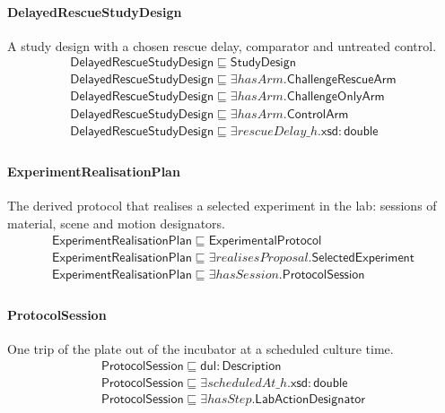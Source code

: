 \documentclass[10pt]{article}
\begin{document}
\paragraph{DelayedRescueStudyDesign} A study design with a chosen rescue delay, comparator and untreated control.
\[\begin{array}{l}
\mathsf{DelayedRescueStudyDesign} \sqsubseteq  \mathsf{StudyDesign} \\
\mathsf{DelayedRescueStudyDesign} \sqsubseteq  \exists \mathit{hasArm}.\mathsf{ChallengeRescueArm} \\
\mathsf{DelayedRescueStudyDesign} \sqsubseteq  \exists \mathit{hasArm}.\mathsf{ChallengeOnlyArm} \\
\mathsf{DelayedRescueStudyDesign} \sqsubseteq  \exists \mathit{hasArm}.\mathsf{ControlArm} \\
\mathsf{DelayedRescueStudyDesign} \sqsubseteq  \exists \mathit{rescueDelay\_h}.\mathsf{xsd{:}double} \\
\end{array}\]
\paragraph{ExperimentRealisationPlan} The derived protocol that realises a selected experiment in the lab: sessions of material, scene and motion designators.
\[\begin{array}{l}
\mathsf{ExperimentRealisationPlan} \sqsubseteq  \mathsf{ExperimentalProtocol} \\
\mathsf{ExperimentRealisationPlan} \sqsubseteq  \exists \mathit{realisesProposal}.\mathsf{SelectedExperiment} \\
\mathsf{ExperimentRealisationPlan} \sqsubseteq  \exists \mathit{hasSession}.\mathsf{ProtocolSession} \\
\end{array}\]
\paragraph{ProtocolSession} One trip of the plate out of the incubator at a scheduled culture time.
\[\begin{array}{l}
\mathsf{ProtocolSession} \sqsubseteq  \mathsf{dul{:}Description} \\
\mathsf{ProtocolSession} \sqsubseteq  \exists \mathit{scheduledAt\_h}.\mathsf{xsd{:}double} \\
\mathsf{ProtocolSession} \sqsubseteq  \exists \mathit{hasStep}.\mathsf{LabActionDesignator} \\
\end{array}\]
\end{document}
